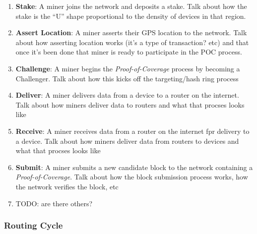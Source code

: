 \documentclass[letterpaper,11pt]{article}
\def\proofofcoverage/{\emph{Proof-of-Coverage}}
\newcommand{\todo}[1]{}
\renewcommand{\todo}[1]{{\color{red} TODO: {#1}}}
\begin{document}
\begin{enumerate}
  \item \textbf{Stake}: A miner joins the network and deposits a stake.\newline
  Talk about how the stake is the ``U'' shape proportional to the density of devices in that region.\newline

  \item \textbf{Assert Location}: A miner asserts their GPS location to the network.\newline
  Talk about how asserting location works (it's a type of transaction? etc) and that once it's been done that miner is ready to participate in the POC process.\newline

  \item \textbf{Challenge}: A miner begins the \proofofcoverage/ process by becoming a Challenger.\newline
  Talk about how this kicks off the targeting/hash ring process\newline

  \item \textbf{Deliver}: A miner delivers data from a device to a router on the internet.\newline
  Talk about how miners deliver data to routers and what that procses looks like\newline

  \item \textbf{Receive}: A miner receives data from a router on the internet fpr delivery to a device.\newline
  Talk about how miners deliver data from routers to devices and what that procses looks like\newline

  \item \textbf{Submit}: A miner submits a new candidate block to the network containing a \proofofcoverage/.\newline
  Talk about how the block submission process works, how the network verifies the block, etc\newline

  \item \todo{are there others?}

\end{enumerate}

\subsubsection{Routing Cycle}
\end{document}
